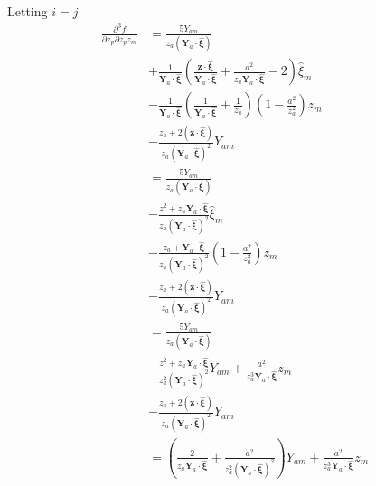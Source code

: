 Letting $i=j$
\begin{align}
\frac{\partial^3 f}{\partial  z_p\partial  z_p z_m}
&=\frac{5Y_{am}}{z_a(\bm Y_a\cdot \hat{\bm \xi})}\\
&+\frac{1}{\bm Y_a\cdot \hat{\bm \xi}}\left(\frac{\bm z\cdot{\hat{\bm \xi}}}{\bm Y_a\cdot \hat{\bm \xi}}+\frac{a^2}{z_a\bm Y_a\cdot \hat{\bm \xi}}-2\right)\hat{\xi}_m\\
&-\frac{1}{\bm Y_a\cdot \hat{\bm \xi}}\left(\frac{1}{\bm Y_a\cdot \hat{\bm \xi}}+\frac{1}{z_a}\right)\left(1-\frac{a^2}{z_a^2}\right)z_m\\
&-\frac{z_a+2(\bm z\cdot\hat{\bm \xi})}{z_a(\bm Y_a\cdot \hat{\bm \xi})^2}Y_{am}\nonumber\\
%
&=\frac{5Y_{am}}{z_a(\bm Y_a\cdot \hat{\bm \xi})}\\
&-\frac{z^2+z_a \bm Y_a\cdot \hat{\bm \xi}}{z_a(\bm Y_a\cdot \hat{\bm \xi})^2}\hat{\xi}_m\\
&-\frac{z_a+\bm Y_a\cdot \hat{\bm \xi}}{z_a(\bm Y_a\cdot \hat{\bm \xi})^2}\left(1-\frac{a^2}{z_a^2}\right)z_m\\
&-\frac{z_a+2(\bm z\cdot\hat{\bm \xi})}{z_a(\bm Y_a\cdot \hat{\bm \xi})^2}Y_{am}\\
%
&=\frac{5Y_{am}}{z_a(\bm Y_a\cdot \hat{\bm \xi})}\\
&-\frac{z^2+z_a\bm Y_a\cdot \hat{\bm \xi}}{z_a^2(\bm Y_a\cdot \hat{\bm \xi})^2}Y_{am}+\frac{a^2}{z_a^3 \bm Y_a\cdot \hat{\bm \xi}}z_m\nonumber\\
&-\frac{z_a+2(\bm z\cdot\hat{\bm \xi})}{z_a(\bm Y_a\cdot \hat{\bm \xi})^2}Y_{am}\nonumber\\
%
&=\left(\frac{2}{z_a\bm Y_a\cdot \hat{\bm \xi}}+\frac{a^2}{z_a^2(\bm Y_a\cdot \hat{\bm \xi})^2}\right)Y_{am}+\frac{a^2}{z_a^3 \bm Y_a\cdot \hat{\bm \xi}}z_m
\end{align}




